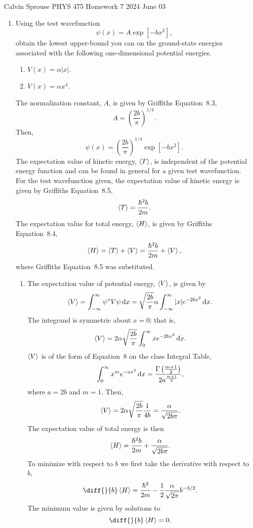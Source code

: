 \documentclass[a4paper, 12pt]{config/homework}
\begin{document}
\noindent
Calvin Sprouse \hfill PHYS 475 Homework 7 \hfill 2024 June 03
\bigskip

\begin{enumerate}
\item Using the test wavefunction
\[\psi(x) = A\exp\left[-bx^2\right],\]
obtain the lowest upper-bound you can on the ground-state energies associated with the following one-dimensional potential energies.
\begin{enumerate}[label=(\alph*)]
\item \(V(x)=\alpha |x|\).
\item \(V(x)=\alpha x^4\).
\end{enumerate}
\bigskip
The normalization constant, \(A\), is given by Griffiths Equation~8.3,
\[A = \left(\frac{2b}{\pi}\right)^{1/4}.\]
Then,
\[\psi(x) = \left(\frac{2b}{\pi}\right)^{1/4}\exp\left[-bx^2\right].\]
The expectation value of kinetic energy, \(\left\langle T \right\rangle\), is independent of the potential energy function and can be found in general for a given test wavefunction. For the test wavefunction given, the expectation value of kinetic energy is given by Griffiths Equation~8.5,
\[\left\langle T \right\rangle = \frac{\hbar^2 b}{2m}.\]
The expectation value for total energy, \(\left\langle H \right\rangle\), is given by Griffiths Equation~8.4,
\[\left\langle H \right\rangle = \left\langle T \right\rangle + \left\langle V \right\rangle = \frac{\hbar^2 b}{2m} + \left\langle V \right\rangle,\]
where Griffiths Equation~8.5 was substituted.
\begin{enumerate}[label=(\alph*)]
\pagebreak
\item The expectation value of potential energy, \(\left\langle V \right\rangle\), is given by
\[\left\langle V \right\rangle = \int_{-\infty}^{\infty}{\psi^* V \psi \, \text{d}x} = \sqrt{\frac{2b}{\pi}}\alpha\int_{-\infty}^{\infty}{|x|e^{-2bx^2} \, \text{d}x}.\]
The integrand is symmetric about \(x=0\); that is,
\[\left\langle V \right\rangle = 2 \alpha \sqrt{\frac{2b}{\pi}} \int_{0}^{\infty}{xe^{-2bx^2} \, \text{d}x}.\]
\(\left\langle V \right\rangle\) is of the form of Equation~8 on the class Integral Table,
\[\int_{0}^{\infty}{x^m e^{-ax^2} \, \text{d}x} = \frac{\Gamma\left(\frac{m+1}{2}\right)}{2a^{\frac{m+1}{2}}},\]
where \(a=2b\) and \(m=1\). Then,
\[\left\langle V \right\rangle = 2\alpha\sqrt{\frac{2b}{\pi}}\frac{1}{4b} = \frac{\alpha}{\sqrt{2b\pi}}.\]
The expectation value of total energy is then
\[\left\langle H \right\rangle = \frac{\hbar^2 b}{2m} + \frac{\alpha}{\sqrt{2b\pi}}.\]
To minimize with respect to \(b\) we first take the derivative with respect to \(b\),
\[\diff{}{b}\expval{H} = \frac{\hbar^2}{2m} - \frac{1}{2}\frac{\alpha}{\sqrt{2\pi}}b^{-3/2}.\]
The minimum value is given by solutions to
\[\diff{}{b}\expval{H} = 0.\]

\end{enumerate}
\end{enumerate}
\end{document}
